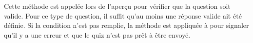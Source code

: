 \documentclass[a4,10pt,french]{sphinxmanual}
\begin{document}
\begin{fulllineitems}

\begin{fulllineitems}
\label{front-end:SimpleQuestion.check_question}
Cette méthode est appelée lors de l'aperçu pour vérifier que la question
soit valide. Pour ce type de question, il suffit qu'au moins une réponse
valide ait été définie. Si la condition n'est pas remplie, la méthode
 est appliquée à  pour signaler qu'il y a une erreur
et que le quiz n'est pas prêt à être envoyé.

\end{fulllineitems}


\end{fulllineitems}

\end{document}
